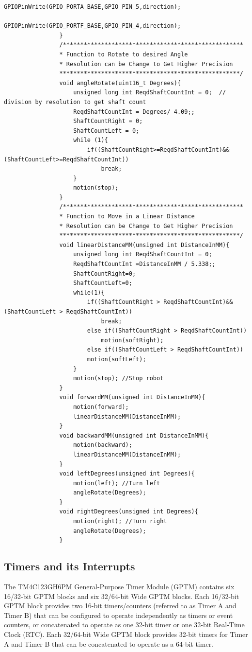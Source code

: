 \documentclass[a4paper,10pt,oneside]{article}
\begin{document}
\begin{lstlisting}[style=CStyle]
					GPIOPinWrite(GPIO_PORTA_BASE,GPIO_PIN_5,direction);
					GPIOPinWrite(GPIO_PORTF_BASE,GPIO_PIN_4,direction);
				}
				/****************************************************
				* Function to Rotate to desired Angle
				* Resolution can be Change to Get Higher Precision
				****************************************************/
				void angleRotate(uint16_t Degrees){
					unsigned long int ReqdShaftCountInt = 0;  // division by resolution to get shaft count
					ReqdShaftCountInt = Degrees/ 4.09;;
					ShaftCountRight = 0;
					ShaftCountLeft = 0;
					while (1){
						if((ShaftCountRight>=ReqdShaftCountInt)&&(ShaftCountLeft>=ReqdShaftCountInt))
							break;
					}
					motion(stop);
				}
				/****************************************************
				* Function to Move in a Linear Distance
				* Resolution can be Change to Get Higher Precision
				****************************************************/
				void linearDistanceMM(unsigned int DistanceInMM){
					unsigned long int ReqdShaftCountInt = 0;
					ReqdShaftCountInt =DistanceInMM / 5.338;;
					ShaftCountRight=0;
					ShaftCountLeft=0;
					while(1){
						if((ShaftCountRight > ReqdShaftCountInt)&&(ShaftCountLeft > ReqdShaftCountInt))
							break;
						else if((ShaftCountRight > ReqdShaftCountInt))
							motion(softRight);
						else if((ShaftCountLeft > ReqdShaftCountInt))
						motion(softLeft);
					}
					motion(stop); //Stop robot
				}
				void forwardMM(unsigned int DistanceInMM){
					motion(forward);
					linearDistanceMM(DistanceInMM);
				}	
				void backwardMM(unsigned int DistanceInMM){
					motion(backward);
					linearDistanceMM(DistanceInMM);
				}
				void leftDegrees(unsigned int Degrees){
					motion(left); //Turn left
					angleRotate(Degrees);
				}
				void rightDegrees(unsigned int Degrees){
					motion(right); //Turn right
					angleRotate(Degrees);
				}
			\end{lstlisting}
			
		\subsection{\huge \textbf{Timers and its Interrupts}}
			{The TM4C123GH6PM General-Purpose Timer Module (GPTM) contains six 16/32-bit GPTM blocks	and six 32/64-bit Wide GPTM blocks. Each 16/32-bit GPTM block provides two 16-bit timers/counters	(referred to as Timer A and Timer B) that can be configured to operate independently as timers or event counters, or concatenated to operate as one 32-bit timer or one 32-bit Real-Time Clock (RTC). Each 32/64-bit Wide GPTM block provides 32-bit timers for Timer A and Timer B that can be concatenated to operate as a 64-bit timer.}\\
			
\end{document}
